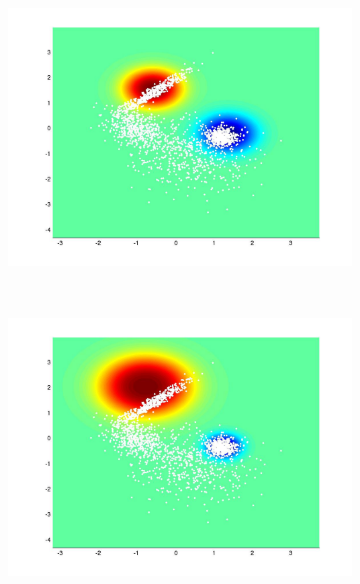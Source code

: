 \documentclass[useAMS,usenatbib,fleqn]{mn2e}
\begin{document}
\begin{figure}
         \begin{subfigure}[b]{70 px}
                \includegraphics[trim = 150px 100px 150px 70px, clip=true,width=\textwidth]{global2.jpg}
        \end{subfigure}
        ~
         \begin{subfigure}[b]{70 px}
                \includegraphics[trim = 150px 100px 150px 70px, clip=true,width=\textwidth]{VL2.jpg}
        \end{subfigure}
        ~
        \begin{subfigure}[b]{70 px}

\end{subfigure}
\end{figure}
\end{document}
